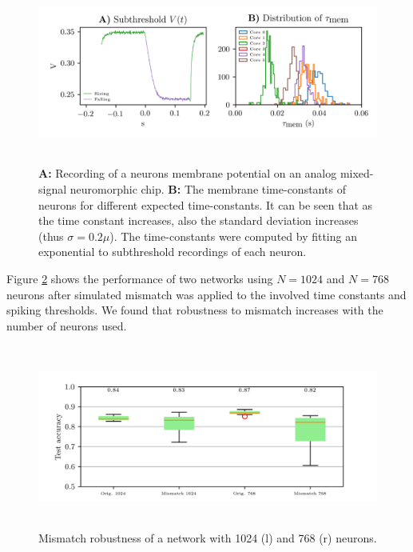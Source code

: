 \documentclass[twoside,11pt,titlepage]{article}
\begin{document}
\begin{figure}[!htb]
  \includegraphics[width = \columnwidth, height=6cm]{figures/figure5.png}
  \caption{\textbf{A:} Recording of a neurons membrane potential on an analog mixed-signal neuromorphic chip. \textbf{B:} The membrane time-constants of neurons for different expected time-constants.
  It can be seen that as the time constant increases, also the standard deviation increases (thus $\sigma=0.2\mu$).
  The time-constants were computed by fitting an exponential to subthreshold recordings of each neuron.}
  \label{fig:figure5}
\end{figure}

Figure \ref{fig:figure8} shows the performance of two networks using $N=1024$ and $N=768$ neurons after simulated mismatch was
applied to the involved time constants and spiking thresholds. We found that robustness to mismatch increases with the number
of neurons used.

\begin{figure}[!htb]
  \includegraphics[width = \columnwidth, height=6cm]{figures/figure8.png}
  \caption{Mismatch robustness of a network with 1024 (l) and 768 (r) neurons.}
  \label{fig:figure8}
\end{figure}
\end{document}
